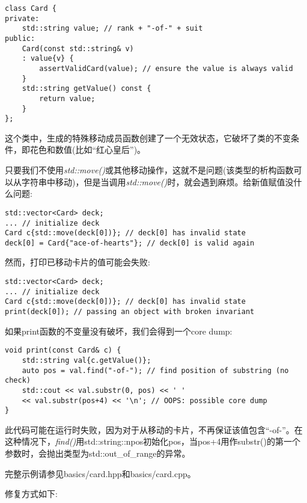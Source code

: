 \begin{lstlisting}[caption={}]
class Card {
private:
	std::string value; // rank + "-of-" + suit
public:
	Card(const std::string& v)
	: value{v} {
		assertValidCard(value); // ensure the value is always valid
	}
	std::string getValue() const {
		return value;
	}
};
\end{lstlisting}

这个类中，生成的特殊移动成员函数创建了一个无效状态，它破坏了类的不变条件，即花色和数值(比如“红心皇后”)。\par

只要我们不使用\textit{std::move()}或其他移动操作，这就不是问题(该类型的析构函数可以从字符串中移动)，但是当调用\textit{std::move()}时，就会遇到麻烦。给新值赋值没什么问题:\par

\begin{lstlisting}[caption={}]
std::vector<Card> deck;
... // initialize deck
Card c{std::move(deck[0])}; // deck[0] has invalid state
deck[0] = Card{"ace-of-hearts"}; // deck[0] is valid again
\end{lstlisting}

然而，打印已移动卡片的值可能会失败:\par

\begin{lstlisting}[caption={}]
std::vector<Card> deck;
... // initialize deck
Card c{std::move(deck[0])}; // deck[0] has invalid state
print(deck[0]); // passing an object with broken invariant
\end{lstlisting}

如果print函数的不变量没有破坏，我们会得到一个core dump:\par

\begin{lstlisting}[caption={}]
void print(const Card& c) {
	std::string val{c.getValue()};
	auto pos = val.find("-of-"); // find position of substring (no check)
	std::cout << val.substr(0, pos) << ' '
	<< val.substr(pos+4) << '\n'; // OOPS: possible core dump
}
\end{lstlisting}

此代码可能在运行时失败，因为对于从移动的卡片，不再保证该值包含“-of-”。在这种情况下，\textit{find()}用std::string::npos初始化pos，当pos+4用作substr()的第一个参数时，会抛出类型为std::out\_of\_range的异常。\par

完整示例请参见basics/card.hpp和basics/card.cpp。\par

修复方式如下:\par

